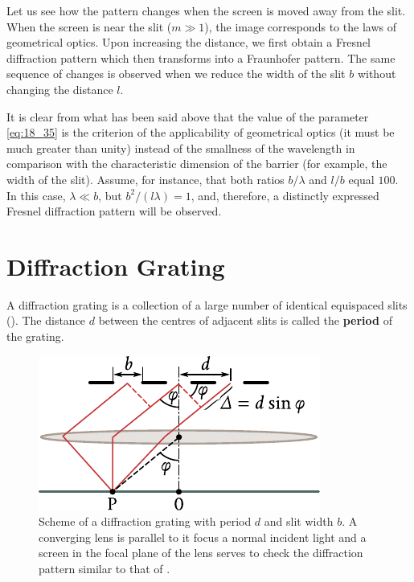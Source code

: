 Let us see how the pattern changes when the screen is moved away from the slit.
When the screen is near the slit ($m\gg 1$), the image corresponds to the laws of geometrical optics.
Upon increasing the distance, we first obtain a Fresnel diffraction pattern which then transforms into a Fraunhofer pattern.
The same sequence of changes is observed when we reduce the width of the slit $b$ without changing
the distance $l$.

It is clear from what has been said above that the value of the parameter \eqref{eq:18_35} is the criterion of the applicability of geometrical optics (it must be much greater than unity) instead of the smallness of the wavelength in comparison with the characteristic dimension of the barrier (for example, the width of the slit).
Assume, for instance, that both ratios $b/\lambda$ and $l/b$ equal $100$.
In this case, $\lambda\ll b$, but $b^2/(l\lambda)=1$, and, therefore, a distinctly expressed Fresnel diffraction pattern will be observed.

\section{Diffraction Grating}\label{sec:18_6}

A diffraction grating is a collection of a large number of identical equispaced slits ().
The distance $d$ between the centres of adjacent slits is called the \textbf{period} of the grating.

\begin{figure}[!htb]
	\begin{center}
		\includegraphics[scale=0.95]{figures/ch_18/fig_18_32.pdf}
        \caption[]{Scheme of a diffraction grating with period $d$ and slit width $b$. A converging lens is parallel to it focus a normal incident light and a screen in the focal plane of the lens serves to check the diffraction pattern similar to that of .}
		\label{fig:18_32}
	\end{center}
	\vspace{-0.9cm}
\end{figure}


